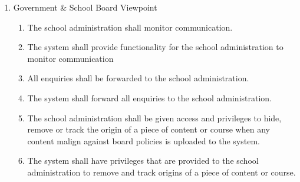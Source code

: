 \documentclass[]{article}
\begin{document}
\begin{enumerate}[{BE}1.]
\begin{enumerate}[{VP1}.1]
		\item Government \& School Board Viewpoint
			\begin{enumerate}
				\item The school administration shall monitor communication.
				\item The system shall provide functionality for the school administration 
to monitor communication
				\item All enquiries shall be
forwarded to the school administration.
				\item The system shall forward all enquiries to the school administration.
				\item The school
administration shall be given access and privileges to hide, remove or track the
origin of a piece of content or course when any content malign against board
policies is uploaded to the system.
				\item The system shall have privileges that are provided to the school 
administration to remove and track origins of a piece of content or course.
			\end{enumerate}
	\end{enumerate}


\end{enumerate}
\end{document}
